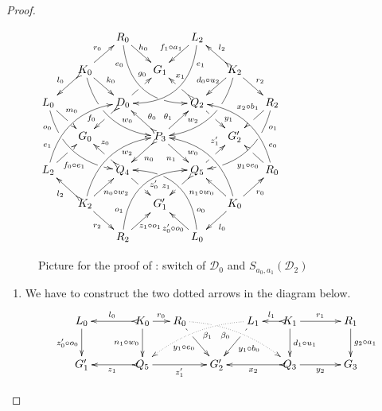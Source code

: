 \documentclass[a4paper,UKenglish,cleveref,pdftex,thm-restate,numberwithinsect,anonymous]{lipics}
\def\G{\textbf {\textup{G}}}
\newcommand{\dder}[1]{\mathscr{#1}}
\begin{document}
\begin{proof}
	
	\begin{figure}
		\centering
		$\xymatrix@C=15pt@R=15pt{&&R_0 \ar@/_.8cm/[ddrr]_(.2){e_0}|(.7)\hole
			\ar[dr]^{\hspace{-5pt}h_0}&& L_2\ar@/^.8cm/[ddll]^(.2){e_1}
			\ar[dl]_{f_1\circ a_1\hspace{-5pt}}\\&K_0\ar[dr]^{k_0}\ar@{>->}[dl]_{l_0}
			\ar@/_.6cm/[ddrr]|(.36)\hole^(.65){w_0}\ar[ur]^{r_0}&& G_1 &&
			K_2 \ar@/^.6cm/[ddll]|(.36)\hole_(.65){w_2}\ar[dl]_{d_0\circ
				u_2\hspace{-5pt}}\ar@{>->}[lu]_{l_2} \ar[dr]^{r_2}\\L_0
			\ar@/_.6cm/[ddrr]_(.2){o_0}|(.31)\hole|(.81)\hole
			\ar[dr]^(.4){m_0}|(.61)\hole && D_0
			\ar@{>->}[dl]|(.4)\hole_(.65){f_0}\ar[ur]|(.5)\hole^(.7){g_0}&&Q_2
			\ar[dr]|(.4)\hole^(.65){y_1}
			\ar@{>->}[ul]|(.5)\hole_(.65){x_1}&&R_2\ar@/^.6cm/[ddll]^(.2){o_1}|(.31)\hole|(.81)\hole\ar[dl]_(.3){x_2\circ
				b_1}|(.58)\hole \\&G_0 &&P_3\ar[dr]_{n_1}
			\ar@{>->}[dl]^{n_0}\ar[ur]^(.4){\theta_1}\ar@{>->}[ul]_(.4){\theta_0}&&G'_2\\L_2
			\ar@/^.6cm/[uurr]^(.2){e_1} \ar[ur]_(.35){f_0\circ
				e_1}|(.61)\hole&&Q_4
			\ar@{>->}[ul]|(.4)\hole_(.65){z_0}\ar[dr]|(.5)\hole^(.65){z'_0}
			&&Q_5\ar[ur]|(.4)\hole^(.65){z'_1}
			\ar@{>->}[dl]|(.5)\hole_(.65){z_1} && R_0 \ar[ul]^(.3){y_1\circ
				e_0}|(.6)\hole\ar@/_.6cm/[uull]_(.2){e_0}\\&K_2
			\ar[ur]_{\hspace{-2pt}n_0\circ w_2} \ar[dr]_{r_2}
			\ar@{>->}[ul]^{l_2}\ar@/^.6cm/[uurr]_(.65){w_2}&&G'_1&& K_0
			\ar[ur]_{r_0} \ar[ul]^{n_1\circ w_0} \ar[dl]^{l_0}
			\ar@/_.6cm/[uull]^(.65){w_0}\\&& R_2
			\ar[ur]_{\hspace{-4pt}z_1\circ
				o_1}\ar@/^.8cm/[uurr]^(.2){o_1}&& L_0 \ar[ul]^{z'_0\circ
				o_0\hspace{-7pt}} \ar@/_.8cm/[uull]_(.2){o_0} |(.69)\hole
		}	$
		\caption{Picture for the proof of : switch of $\dder{D}_0$ and $S_{a_0,a_1}(\dder{D}_2)$}
		\label{fi:third}
	\end{figure}
	
	\begin{enumerate}
		\item We have to construct the two dotted arrows in the diagram
		below.
		\[\xymatrix@C=15pt{L_0 \ar[d]_{z'_0\circ o_0}&& K_0
			\ar[d]_{n_1\circ w_0}\ar@{>->}[ll]_{l_0} \ar[r]^{r_0} & R_0
			\ar@{.>}@/^.35cm/[drrr]_(.4){\beta_0}|(.285)\hole
			\ar[dr]|(.28)\hole_{y_1\circ e_0} && L_1
			\ar@{.>}@/_.35cm/[dlll]^(.4){\beta_1}
			\ar[dl]|(.28)\hole^{y_1\circ b_0}& K_1 \ar[d]^{d_1\circ
				u_1}\ar@{>->}[l]_{l_1} \ar[rr]^{r_1} && R_1 \ar[d]^{g_2\circ
				a_1}\\G'_1 && \ar@{>->}[ll]^{z_1} Q_5 \ar[rr]_{z'_1}&& G'_2 &&
			\ar@{>->}[ll]^{x_2} Q_3 \ar[rr]_{y_2}&& G_3}\]
		

\end{enumerate}
\end{proof}
\end{document}
